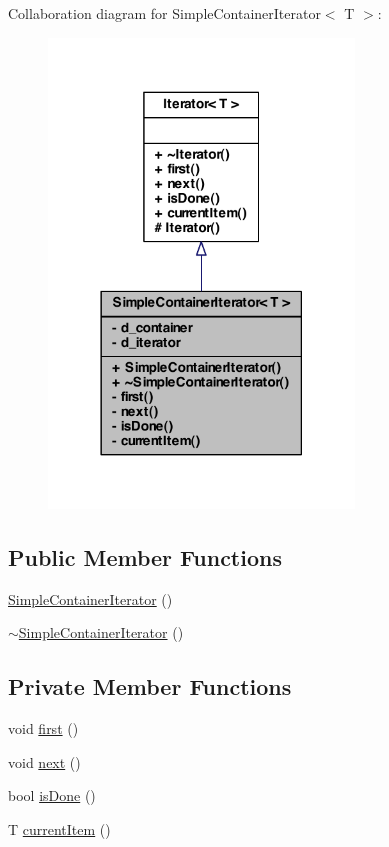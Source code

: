 Collaboration diagram for SimpleContainerIterator$<$ T $>$:\nopagebreak
\begin{figure}[H]
\begin{center}
\leavevmode
\includegraphics[width=230pt]{class_simple_container_iterator__coll__graph}
\end{center}
\end{figure}
\subsection*{Public Member Functions}
\begin{DoxyCompactItemize}
\item 
\hyperlink{class_simple_container_iterator_a7efe60ad1b976260e29cfc793b9f5b1a}{SimpleContainerIterator} ()
\item 
\hyperlink{class_simple_container_iterator_a4f1d34a0c187f4359885755372b6aa79}{$\sim$SimpleContainerIterator} ()
\end{DoxyCompactItemize}
\subsection*{Private Member Functions}
\begin{DoxyCompactItemize}
\item 
void \hyperlink{class_simple_container_iterator_a71b26d5acddcab75ca0386c187fd2bbc}{first} ()
\item 
void \hyperlink{class_simple_container_iterator_a11274af2bc4dc9930f983b7b246d8f87}{next} ()
\item 
bool \hyperlink{class_simple_container_iterator_a91352e803f39fb58d9312d9d866842c8}{isDone} ()
\item 
T \hyperlink{class_simple_container_iterator_ad65642e6d9540b58193e7a40f1688fc7}{currentItem} ()
\end{DoxyCompactItemize}
